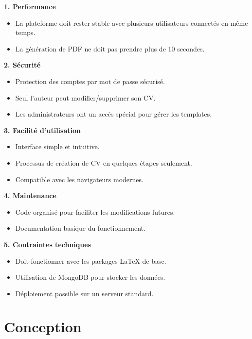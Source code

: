 \documentclass{report}
\begin{document}
\textbf{1. Performance}
\begin{itemize}
    \item La plateforme doit rester stable avec plusieurs utilisateurs connectés en même temps.
    \item La génération de PDF ne doit pas prendre plus de 10 secondes.
\end{itemize}

\par

\textbf{2. Sécurité}
\begin{itemize}
    \item Protection des comptes par mot de passe sécurisé.
    \item Seul l'auteur peut modifier/supprimer son CV.
    \item Les administrateurs ont un accès spécial pour gérer les templates.
\end{itemize}

\par

\textbf{3. Facilité d'utilisation}
\begin{itemize}
    \item Interface simple et intuitive.
    \item Processus de création de CV en quelques étapes seulement.
    \item Compatible avec les navigateurs modernes.
\end{itemize}

\par

\textbf{4. Maintenance}
\begin{itemize}
    \item Code organisé pour faciliter les modifications futures.
    \item Documentation basique du fonctionnement.
\end{itemize}

\par

\textbf{5. Contraintes techniques}
\begin{itemize}
    \item Doit fonctionner avec les packages LaTeX de base.
    \item Utilisation de MongoDB pour stocker les données.
    \item Déploiement possible sur un serveur standard.
\end{itemize}

\section{Conception}
\clearpage
\end{document}
